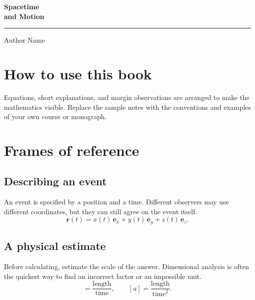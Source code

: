 \documentclass[11pt,twoside]{book}
\begin{document}
\begin{titlepage}
\centering
\vspace*{0.8in}
{\fontsize{38}{44}\selectfont\bfseries Spacetime\\and Motion\par}
\vspace{18pt}\textcolor{physicsred}{\rule{0.65\textwidth}{2pt}}\par
\vspace{20pt}{\Large Notes in introductory physics\par}
\vfill
{\Large Author Name\par}\vspace{6pt}{\large Institution or laboratory\par}
\end{titlepage}
\frontmatter
\chapter*{How to use this book}
Equations, short explanations, and margin observations are arranged to make
the mathematics visible. Replace the sample notes with the conventions and
examples of your own course or monograph.
\tableofcontents
\mainmatter
\chapter{Frames of reference}
\section{Describing an event}
An event is specified by a position and a time. Different observers may use
different coordinates, but they can still agree on the event itself.
\begin{equation}
  \mathbf r(t)=x(t)\,\mathbf e_x+y(t)\,\mathbf e_y+z(t)\,\mathbf e_z.
\end{equation}
\section{A physical estimate}
Before calculating, estimate the scale of the answer. Dimensional analysis is
often the quickest way to find an incorrect factor or an impossible unit.
\begin{equation}
  [v]=\frac{\mathrm{length}}{\mathrm{time}},\qquad
  [a]=\frac{\mathrm{length}}{\mathrm{time}^2}.
\end{equation}
\end{document}
